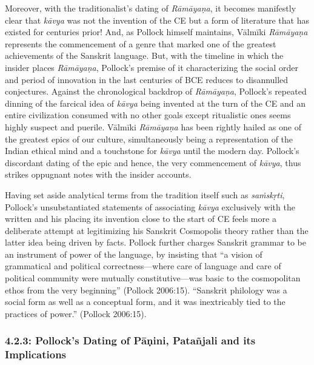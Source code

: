 Moreover, with the traditionalist’s dating of \textit{Rāmāyaṇa}, it becomes manifestly clear that \textit{kāvya} was not the invention of the CE but a form of literature that has existed for centuries prior! And, as Pollock himself maintains, Vālmīki \textit{Rāmāyaṇa} represents the commencement of a genre that marked one of the greatest achievements of the Sanskrit language. But, with the timeline in which the insider places \textit{Rāmāyaṇa}, Pollock’s premise of it characterizing the social order and period of innovation in the last centuries of BCE reduces to disannulled conjectures. Against the chronological backdrop of \textit{Rāmāyaṇa}, Pollock’s repeated dinning of the farcical idea of \textit{kāvya} being invented at the turn of the CE and an entire civilization consumed with no other goals except ritualistic ones seems highly suspect and puerile. Vālmīki \textit{Rāmāyaṇa} has been rightly hailed as one of the greatest epics of our culture, simultaneously being a representation of the Indian ethical mind and a touchstone for \textit{kāvya} until the modern day. Pollock’s discordant dating of the epic and hence, the very commencement of \textit{kāvya}, thus strikes oppugnant notes with the insider accounts.

Having set aside analytical terms from the tradition itself such as \textit{saṁskṛti}, Pollock’s unsubstantiated statements of associating \textit{kāvya} exclusively with the written and his placing its invention close to the start of CE feels more a deliberate attempt at legitimizing his Sanskrit Cosmopolis theory rather than the latter idea being driven by facts. Pollock further charges Sanskrit grammar to be an instrument of power of the language, by insisting that “a vision of grammatical and political correctness—where care of language and care of political community were mutually constitutive—was basic to the cosmopolitan ethos from the very beginning” (Pollock 2006:15). “Sanskrit philology was a social form as well as a conceptual form, and it was inextricably tied to the practices of power.” (Pollock 2006:15).

\vspace{-.3cm}

\subsubsection*{4.2.3: Pollock’s Dating of Pāṇini, Patañjali and its Implications}

\vspace{-.2cm}

